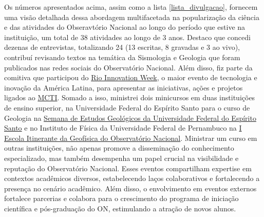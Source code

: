 \documentclass[10pt,a4paper,oneside]{book}
\begin{document}
Os números apresentados acima, assim como a lista \ref{lista_divulgacao}, fornecem uma visão detalhada dessa abordagem multifacetada na popularização da ciência e das atividades do Obseravtório Nacional ao longo do período que estive na instituição, um total de 38 atividades ao longo de 3 anos. Destaco que concedi dezenas de entrevistas, totalizando 24 (13 escritas, 8 gravadas e 3 ao vivo), contribuí revisando textos na temática da Sismologia e Geologia que foram publicados nas redes sociais do Observatório Nacional. Além disso, fiz parte da comitiva que participou do \href{https://www.gov.br/observatorio/pt-br/assuntos/areas-de-atuacao/divulgacao-e-popularizacao-da-ciencia/on-riw}{Rio Innovation Week}, o maior evento de tecnologia e inovação da América Latina, para apresentar as iniciativas, ações e projetos ligados ao \href{https://www.gov.br/mcti/pt-br}{MCTI}. Somado a isso, ministrei dois minicursos em duas instituições de ensino superior, na Universidade Federal do Espírito Santo para o curso de Geologia na \href{https://www.instagram.com/segeo.ufes/}{Semana de Estudos Geológicos da Universidade Federal do Espírito Santo} e no Instituto de Física da Universidade Federal de Pernambuco na \href{https://www.gov.br/observatorio/pt-br/assuntos/noticias/i-escola-itinerante-da-geofisica-do-observatorio-nacional-e-realizada-na-ufpe}{I Escola Itinerante da Geofísica do Observatório Nacional}. Ministrar um curso em outras instituições, não apenas promove a disseminação do conhecimento especializado, mas também desempenha um papel crucial na visibilidade e reputação do Observatório Nacional. Esses eventos compartilham expertise em contextos acadêmicos diversos, estabelecendo laços colaborativos e fortalecendo a presença no cenário acadêmico. Além disso, o envolvimento em eventos externos fortalece parcerias e colabora para o crescimento do programa de iniciação científica e pós-graduação do ON, estimulando a atração de novos alunos.

\bigskip
\end{document}
